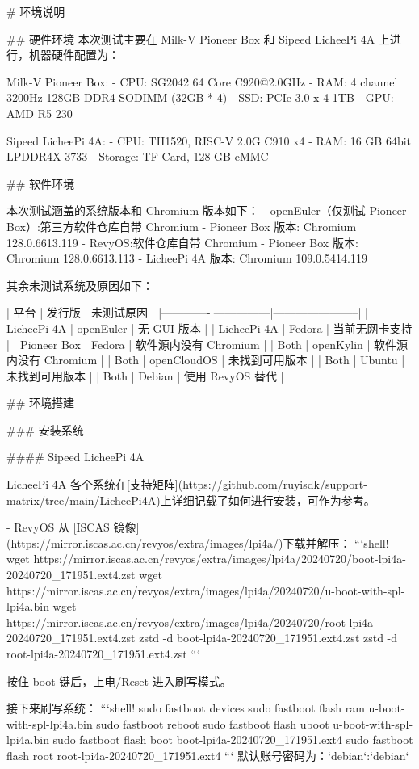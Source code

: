 \documentclass{article}
\begin{document}
\begin{markdown}
# 环境说明

## 硬件环境
本次测试主要在 Milk-V Pioneer Box 和 Sipeed LicheePi 4A 上进行，机器硬件配置为：

Milk-V Pioneer Box:
- CPU: SG2042 64 Core C920@2.0GHz
- RAM: 4 channel 3200Hz 128GB DDR4 SODIMM (32GB * 4)
- SSD: PCIe 3.0 x 4 1TB
- GPU: AMD R5 230

Sipeed LicheePi 4A:
- CPU: TH1520, RISC-V 2.0G C910 x4
- RAM: 16 GB 64bit LPDDR4X-3733
- Storage: TF Card, 128 GB eMMC

## 软件环境

本次测试涵盖的系统版本和 Chromium 版本如下：
- openEuler（仅测试 Pioneer Box）:第三方软件仓库自带 Chromium 
  - Pioneer Box 版本: Chromium 128.0.6613.119
- RevyOS:软件仓库自带 Chromium
  - Pioneer Box 版本: Chromium 128.0.6613.113
  - LicheePi 4A 版本: Chromium 109.0.5414.119
  
其余未测试系统及原因如下：

| 平台        | 发行版        | 未测试原因              |
|-------------|---------------|-----------------------|
| LicheePi 4A | openEuler     | 无 GUI 版本           |
| LicheePi 4A | Fedora        | 当前无网卡支持        |
| Pioneer Box | Fedora        | 软件源内没有 Chromium |
| Both        | openKylin     | 软件源内没有 Chromium |
| Both        | openCloudOS   | 未找到可用版本        |
| Both        | Ubuntu        | 未找到可用版本        |
| Both        | Debian | 使用 RevyOS 替代      |

## 环境搭建

### 安装系统

#### Sipeed LicheePi 4A

LicheePi 4A 各个系统在[支持矩阵](https://github.com/ruyisdk/support-matrix/tree/main/LicheePi4A)上详细记载了如何进行安装，可作为参考。

- RevyOS
从 [ISCAS 镜像](https://mirror.iscas.ac.cn/revyos/extra/images/lpi4a/)下载并解压：
```shell!
wget https://mirror.iscas.ac.cn/revyos/extra/images/lpi4a/20240720/boot-lpi4a-20240720_171951.ext4.zst
wget https://mirror.iscas.ac.cn/revyos/extra/images/lpi4a/20240720/u-boot-with-spl-lpi4a.bin
wget https://mirror.iscas.ac.cn/revyos/extra/images/lpi4a/20240720/root-lpi4a-20240720_171951.ext4.zst
zstd -d boot-lpi4a-20240720_171951.ext4.zst
zstd -d root-lpi4a-20240720_171951.ext4.zst
```

按住 boot 键后，上电/Reset 进入刷写模式。

接下来刷写系统：
```shell!
sudo fastboot devices
sudo fastboot flash ram u-boot-with-spl-lpi4a.bin 
sudo fastboot reboot
sudo fastboot flash uboot u-boot-with-spl-lpi4a.bin
sudo fastboot flash boot boot-lpi4a-20240720_171951.ext4
sudo fastboot flash root root-lpi4a-20240720_171951.ext4
```
默认账号密码为：`debian`:`debian`


\end{markdown}
\end{document}
